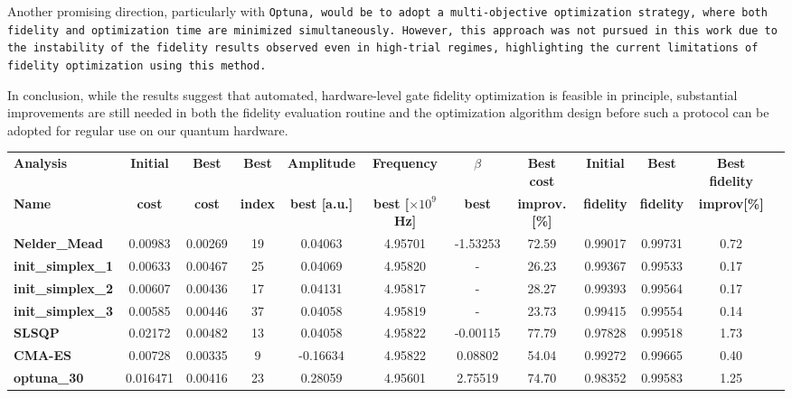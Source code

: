 Another promising direction, particularly with \tt{Optuna}, would be to adopt a multi-objective optimization strategy, where both fidelity and optimization time are minimized simultaneously. 
However, this approach was not pursued in this work due to the instability of the fidelity results observed even in high-trial regimes, highlighting the current limitations of fidelity optimization using this method.

In conclusion, while the results suggest that automated, hardware-level gate fidelity optimization is feasible in principle, substantial improvements are still needed in both the fidelity evaluation routine and the optimization algorithm design before such a protocol can be adopted for regular use on our quantum hardware.

\begin{table}
    \centering
    \begin{tabular}{lccccccccccc}
        \toprule
        \textbf{Analysis} & \textbf{Initial} & \textbf{Best} & \textbf{Best} & \textbf{Amplitude} & \textbf{Frequency} & \textbf{$\beta$} & \textbf{Best cost} & \textbf{Initial} & \textbf{Best} & \textbf{Best fidelity} \\
        \textbf{Name} & \textbf{cost} & \textbf{cost} & \textbf{index} & \textbf{best [a.u.]} & \textbf{ best [$\times10^9$ Hz]} & \textbf{best} & \textbf{improv. [\%]} & \textbf{fidelity} & \textbf{fidelity} & \textbf{improv[\%]} \\
        \midrule
        \textbf{Nelder\_Mead} & 0.00983 & 0.00269 & 19 & 0.04063 & 4.95701 & -1.53253 & 72.59 & 0.99017 & 0.99731 & 0.72 \\
        \textbf{init\_simplex\_1} & 0.00633 & 0.00467 & 25 & 0.04069 & 4.95820 & - & 26.23 & 0.99367 & 0.99533 & 0.17 \\
        \textbf{init\_simplex\_2} & 0.00607 & 0.00436 & 17 & 0.04131 & 4.95817 & - & 28.27 & 0.99393 & 0.99564 & 0.17 \\
        \textbf{init\_simplex\_3} & 0.00585 & 0.00446 & 37 & 0.04058 & 4.95819 & - & 23.73 & 0.99415 & 0.99554 & 0.14 \\
        \textbf{SLSQP} & 0.02172 & 0.00482 & 13 & 0.04058 & 4.95822 & -0.00115 & 77.79 & 0.97828 & 0.99518 & 1.73 \\
        \textbf{CMA-ES} & 0.00728 & 0.00335 & 9 & -0.16634 & 4.95822 & 0.08802 & 54.04 & 0.99272 & 0.99665 & 0.40 \\
        \textbf{optuna\_30} & 0.016471 & 0.00416 & 23 & 0.28059 & 4.95601 & 2.75519 & 74.70 & 0.98352 & 0.99583 & 1.25 \\

\end{tabular}
\end{table}
